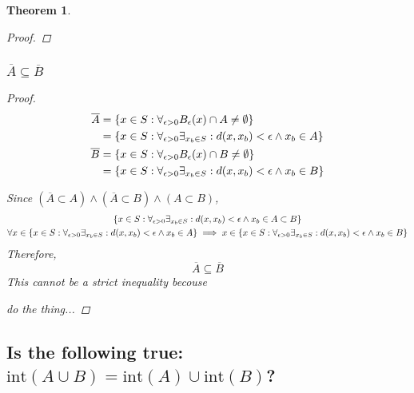 \documentclass[]{article}
\newtheorem{theorem}{Theorem}
\begin{document}
\begin{theorem}
\begin{proof}
    \end{proof}
    \subsubsection{$\overline{A} \subseteq \overline{B}$}
    \begin{proof}
        \begin{align*}
            \overline{A} &= \qty{x \in S : 
                \forall_{\epsilon> 0} B_\epsilon(x) \cap A \neq \emptyset}\\
            &= \qty{x \in S : 
                \forall_{\epsilon> 0} \exists_{x_b \in S} : d(x,x_b) < \epsilon 
                \land x_b \in A}\\
            \overline{B} &= \qty{x \in S : 
                \forall_{\epsilon> 0} B_\epsilon(x) \cap B \neq \emptyset}\\
            &= \qty{x \in S : 
                \forall_{\epsilon> 0} \exists_{x_b \in S} : d(x,x_b) < \epsilon 
                \land x_b \in B}\\
        \end{align*}

        Since $(\overline{A} \subset A) \land (\overline{A} \subset B) \land (A \subset B)$,
        \begin{gather*}
            \qty{x \in S : 
                \forall_{\epsilon> 0} \exists_{x_b \in S} : d(x,x_b) < \epsilon 
                \land x_b \in A \subset B}\\
            \forall x \in \qty{x \in S : 
                \forall_{\epsilon> 0} \exists_{x_b \in S} : d(x,x_b) < \epsilon 
                    \land x_b \in A}
                \implies x \in \qty{x \in S : 
                    \forall_{\epsilon> 0} \exists_{x_b \in S} : d(x,x_b) < \epsilon 
                        \land x_b \in B}
        \end{gather*}
        Therefore,
        $$\overline{A} \subseteq \overline{B}$$
        This cannot be a strict inequality becouse 

do the thing...



    \end{proof}
\end{theorem}

\newpage
\subsection{Is the following true:
$\text{int}(A\cup B) = \text{int}(A) \cup \text{int}(B)$?}
\end{document}
